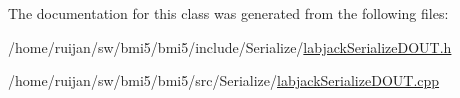 The documentation for this class was generated from the following files\-:\begin{DoxyCompactItemize}
\item 
/home/ruijan/sw/bmi5/bmi5/include/\-Serialize/\hyperlink{labjackSerializeDOUT_8h}{labjack\-Serialize\-D\-O\-U\-T.\-h}\item 
/home/ruijan/sw/bmi5/bmi5/src/\-Serialize/\hyperlink{labjackSerializeDOUT_8cpp}{labjack\-Serialize\-D\-O\-U\-T.\-cpp}\end{DoxyCompactItemize}
